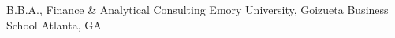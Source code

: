 

\begin{cventries}

  \cventry
    {B.B.A., Finance \& Analytical Consulting} %
    {Emory University, Goizueta Business School} %
    {Atlanta, GA} %
    {} %
    {}

\end{cventries}

